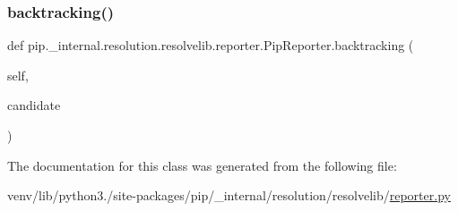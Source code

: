 \subsubsection{\texorpdfstring{backtracking()}{backtracking()}}
{\footnotesize\ttfamily def pip.\+\_\+internal.\+resolution.\+resolvelib.\+reporter.\+Pip\+Reporter.\+backtracking (\begin{DoxyParamCaption}\item[{}]{self,  }\item[{}]{candidate }\end{DoxyParamCaption})}



The documentation for this class was generated from the following file\+:\begin{DoxyCompactItemize}
\item 
venv/lib/python3./site-\/packages/pip/\+\_\+internal/resolution/resolvelib/\hyperlink{reporter_8py}{reporter.\+py}\end{DoxyCompactItemize}
